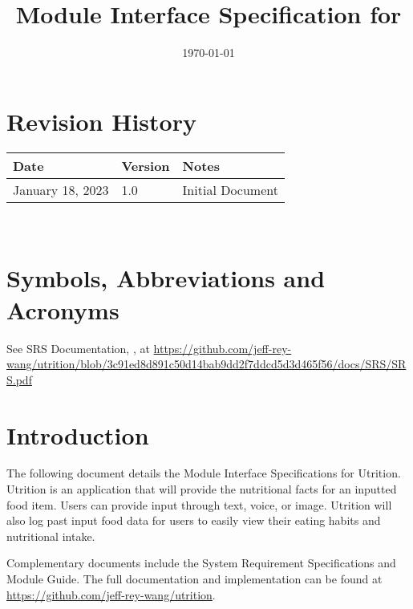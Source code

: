 \documentclass[12pt, titlepage]{article}
\begin{document}
\title{Module Interface Specification for \progname{}}

\author{\authname}

\date{\today}

\maketitle


\section{Revision History}

\begin{tabularx}{\textwidth}{p{3cm}p{2cm}X}
\toprule {\bf Date} & {\bf Version} & {\bf Notes}\\
\midrule
January 18, 2023 & 1.0 & Initial Document\\
\bottomrule
\end{tabularx}

~\newpage

\section{Symbols, Abbreviations and Acronyms}

See SRS Documentation, \cite{SRS}, at \url{https://github.com/jeff-rey-wang/utrition/blob/3c91ed8d891c50d14bab9dd2f7ddcd5d3d465f56/docs/SRS/SRS.pdf}


\newpage

\tableofcontents

\newpage


\section{Introduction}

The following document details the Module Interface Specifications for Utrition. Utrition is an application that will provide the nutritional facts for an inputted food item. Users can provide input through text, voice, or image. Utrition will also log past input food data for users to easily view their eating habits and nutritional intake.

Complementary documents include the System Requirement Specifications
and Module Guide.  The full documentation and implementation can be
found at \url{https://github.com/jeff-rey-wang/utrition}.  
\end{document}
